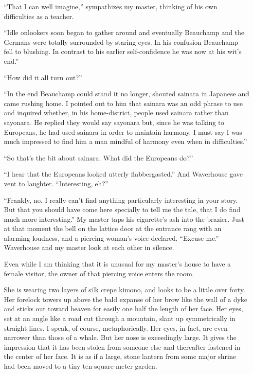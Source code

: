 \documentclass{book}
\begin{document}
``That I can well imagine,'' sympathizes my master, thinking of his own
difficulties as a teacher.

``Idle onlookers soon began to gather around and eventually Beauchamp
and the Germans were totally surrounded by staring eyes. In his
confusion Beauchamp fell to blushing. In contrast to his earlier
self-confidence he was now at his wit's end.''

``How did it all turn out?''

``In the end Beauchamp could stand it no longer, shouted sainara in
Japanese and came rushing home. I pointed out to him that sainara was an
odd phrase to use and inquired whether, in his home-district, people
used sainara rather than sayonara. He replied they would say sayonara
but, since he was talking to Europeans, he had used sainara in order to
maintain harmony. I must say I was much impressed to find him a man
mindful of harmony even when in difficulties.''

``So that's the bit about sainara. What did the Europeans do?''

``I hear that the Europeans looked utterly flabbergasted.'' And
Waverhouse gave vent to laughter. ``Interesting, eh?''

``Frankly, no. I really can't find anything particularly interesting in
your story. But that you should have come here specially to tell me the
tale, that I do find much more interesting.'' My master taps his
cigarette's ash into the brazier. Just at that moment the bell on the
lattice door at the entrance rang with an alarming loudness, and a
piercing woman's voice declared, ``Excuse me.'' Waverhouse and my master
look at each other in silence.

Even while I am thinking that it is unusual for my master's house to
have a female visitor, the owner of that piercing voice enters the room.

She is wearing two layers of silk crepe kimono, and looks to be a little
over forty. Her forelock towers up above the bald expanse of her brow
like the wall of a dyke and sticks out toward heaven for easily one half
the length of her face. Her eyes, set at an angle like a road cut
through a mountain, slant up symmetrically in straight lines. I speak,
of course, metaphorically. Her eyes, in fact, are even narrower than
those of a whale. But her nose is exceedingly large. It gives the
impression that it has been stolen from someone else and thereafter
fastened in the center of her face. It is as if a large, stone lantern
from some major shrine had been moved to a tiny ten-square-meter garden.
\end{document}
